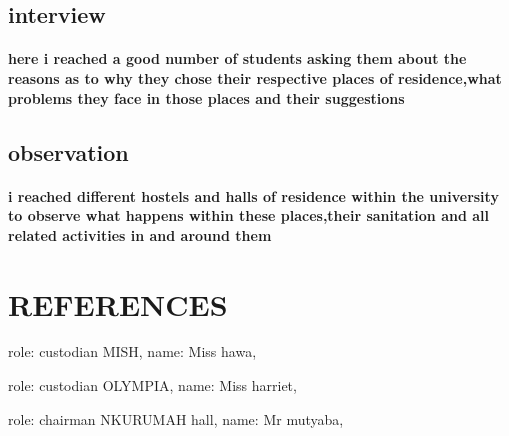\documentclass[a4paper,12pt]{article}
\begin{document}
\subsection{interview}
\paragraph{here i reached a good number of students asking them about the reasons as to why they chose their respective places of residence,what problems they face in those places and their suggestions}
\subsection{observation}
\paragraph{i reached different hostels and halls of residence within the university to observe what happens within these places,their sanitation and all related activities in and around them}
\section{REFERENCES}\label{sec:intro}
{	role: {custodian MISH},
	name:  {Miss hawa},
}


{
	role: {custodian OLYMPIA},
	name:  {Miss harriet},
}

{
	role: {chairman NKURUMAH hall},
	name:  {Mr mutyaba},
}
\end{document}
